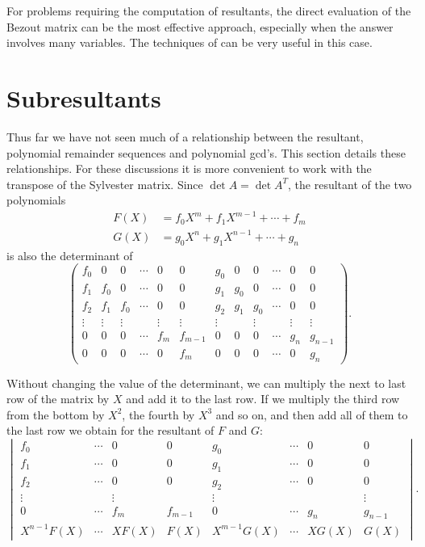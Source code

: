 For problems requiring the computation of resultants, the direct
evaluation of the Bezout matrix can be the most effective approach,
especially when the answer involves many variables.  The techniques of
  can be very useful in this
case.

\section{Subresultants} 
\label{Subresultant:Sec}

Thus far we have not seen much of a relationship between the resultant,
polynomial remainder sequences and polynomial {\sc gcd}'s.  This
section details these relationships.  For these discussions it is
more convenient to work with the transpose of the Sylvester matrix.  Since
$\det A = \det A^{T}$, the resultant of the two polynomials
\[
\begin{aligned}
  F(X)&= f_0 X^m + f_1 X^{m-1} + \cdots + f_m\\
  G(X)&= g_0 X^n + g_1 X^{n-1} + \cdots + g_n 
\end{aligned}
\]
is also the determinant of
\[
\left(
\begin{array}{cccccccccccc}
  f_0 & 0 & 0 & \cdots & 0 & 0 & g_0 & 0 & 0 & \cdots & 0 & 0 \\
  f_1 & f_0 & 0 & \cdots & 0 & 0 & g_1 & g_0 & 0 & \cdots & 0 & 0 \\
  f_2 & f_1 & f_0 & \cdots & 0 & 0 & g_2 & g_1 & g_0 & \cdots & 0 & 0 \\
  \vdots & \vdots & \vdots & & \vdots & \vdots & \vdots & & \vdots & & \vdots & \vdots \\
  0 & 0 & 0 & \cdots & f_m & f_{m-1} & 0 & 0 & 0 & \cdots & g_n & g_{n-1} \\
  0 & 0 & 0 & \cdots & 0 & f_m & 0 & 0 & 0 & \cdots & 0 & g_n 
\end{array}
\right). 
\]

Without changing the value of the determinant, we can multiply the next to
last row of the matrix by $X$ and add it to the last row.  If we multiply
the third row from the bottom by $X^2$, the fourth by $X^3$ and so on, and
then add all of them to the last row we obtain for the resultant of $F$ and
$G$:
\begin{equation}
\begin{vmatrix}
   f_0 & \cdots & 0 & 0 & g_0 & \cdots & 0 & 0 \\
   f_1 & \cdots & 0 & 0 & g_1 & \cdots & 0 & 0 \\
   f_2 & \cdots & 0 & 0 & g_2 & \cdots & 0 & 0 \\
   \vdots & & \vdots & & \vdots & & & \vdots \\
   0 & \cdots & f_m & f_{m-1} & 0 & \cdots & g_n & g_{n-1} \\
   X^{n-1} F(X) & \cdots & X F(X) & F(X)& 
     X^{m-1} G(X) & \cdots & X G(X) & G(X)
\end{vmatrix}. 
\label{Res:Deta:Eq} 
\end{equation}

